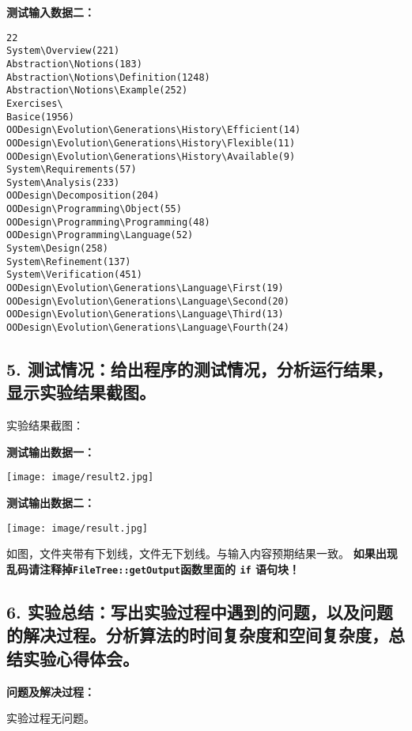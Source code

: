 \documentclass[a4paper]{ctexart}
\begin{document}
\vspace{3em}

\noindent \textbf{测试输入数据二：}
\begin{lstlisting}[numbers=none]
22
System\Overview(221)
Abstraction\Notions(183)
Abstraction\Notions\Definition(1248)
Abstraction\Notions\Example(252)
Exercises\
Basice(1956)
OODesign\Evolution\Generations\History\Efficient(14)
OODesign\Evolution\Generations\History\Flexible(11)
OODesign\Evolution\Generations\History\Available(9)
System\Requirements(57)
System\Analysis(233)
OODesign\Decomposition(204)
OODesign\Programming\Object(55)
OODesign\Programming\Programming(48)
OODesign\Programming\Language(52)
System\Design(258)
System\Refinement(137)
System\Verification(451)
OODesign\Evolution\Generations\Language\First(19)
OODesign\Evolution\Generations\Language\Second(20)
OODesign\Evolution\Generations\Language\Third(13)
OODesign\Evolution\Generations\Language\Fourth(24) 
\end{lstlisting}

\subsection*{5. 测试情况：给出程序的测试情况，分析运行结果，显示实验结果截图。}

实验结果截图：

\noindent \textbf{测试输出数据一：}
\begin{center}
    \texttt{[image: image/result2.jpg]}
\end{center}

\vspace{2em}

\noindent \textbf{测试输出数据二：}
\begin{center}
    \texttt{[image: image/result.jpg]}
\end{center}

如图，文件夹带有下划线，文件无下划线。与输入内容预期结果一致。
\textbf{如果出现乱码请注释掉\texttt{FileTree::getOutput}函数里面的 \texttt{if} 语句块！}

\subsection*{6. 实验总结：写出实验过程中遇到的问题，以及问题的解决过程。分析算法的时间复杂度和空间复杂度，总结实验心得体会。}

\noindent \textbf{问题及解决过程：}

实验过程无问题。
\end{document}
